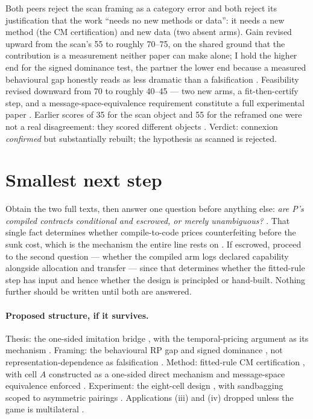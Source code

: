 \documentclass{article}
\begin{document}
Both peers reject the scan framing as a category error and both reject its justification that the work ``needs no new methods or data'': it needs a new method (the CM certification) and new data (two absent arms). Gain revised upward from the scan's 55 to roughly 70--75, on the shared ground that the contribution is a measurement neither paper can make alone; I hold the higher end for the signed dominance test, the partner the lower end because a measured behavioural gap honestly reads as less dramatic than a falsification . Feasibility revised downward from 70 to roughly 40--45 --- two new arms, a fit-then-certify step, and a message-space-equivalence requirement constitute a full experimental paper . Earlier scores of 35 for the scan object and 55 for the reframed one were not a real disagreement: they scored different objects . Verdict: connexion \emph{confirmed} but substantially rebuilt; the hypothesis as scanned is rejected.

\section{Smallest next step}

Obtain the two full texts, then answer one question before anything else: \emph{are P's compiled contracts conditional and escrowed, or merely unambiguous?} . That single fact determines whether compile-to-code prices counterfeiting before the sunk cost, which is the mechanism the entire line rests on . If escrowed, proceed to the second question --- whether the compiled arm logs declared capability alongside allocation and transfer  --- since that determines whether the fitted-rule step has input and hence whether the design is principled or hand-built. Nothing further should be written until both are answered.

\paragraph{Proposed structure, if it survives.} Thesis: the one-sided imitation bridge , with the temporal-pricing argument as its mechanism . Framing: the behavioural RP gap and signed dominance , not representation-dependence as falsification . Method: fitted-rule CM certification , with cell \(A\) constructed as a one-sided direct mechanism  and message-space equivalence enforced . Experiment: the eight-cell design , with sandbagging scoped to asymmetric pairings . Applications (iii) and (iv) dropped unless the game is multilateral .
\end{document}
